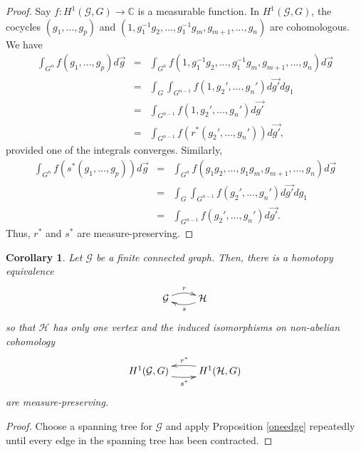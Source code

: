 \documentclass[12pt]{article}
\newtheorem{cor}[thm]{Corollary}
\newcommand{\C}{\mathbb{C}}
\newcommand{\HH}{\mathcal{H}}
\newcommand{\GG}{\mathcal{G}}
\newcommand{\be}{\begin{equation}}
\newcommand{\ee}{\end{equation}}
\newcommand{\bea}{\begin{eqnarray}}
\newcommand{\eea}{\end{eqnarray}}
\newcommand{\nn}{\nonumber}
\begin{document}
\begin{proof}
Say $f : H^1(\GG, G) \to \C$ is a measurable function.  In $H^1(\GG, G)$, the cocycles $(g_1,...,g_p)$ and $(1,g_1^{-1}g_2,...,g_1^{-1}g_m,g_{m+1},...,g_n)$ are cohomologous.  We have
\bea
\int_{G^n} f(g_1,...,g_p)d\vec{g}
&=& \int_{G^n} f(1,g_1^{-1}g_2,...,g_1^{-1}g_m,g_{m+1},...,g_n)d\vec{g}\nn\\
&=& \int_G \int_{G^{n-1}} f(1,g_2',...,g_n')d\vec{g'}dg_1\nn\\
&=& \int_{G^{n-1}} f(1,g_2',...,g_n')d\vec{g'}\nn\\
&=& \int_{G^{n-1}} f(r^*(g_2',...,g_n'))d\vec{g'},
\eea
provided one of the integrals converges.  Similarly,
\bea
\int_{G^n} f(s^*(g_1,...,g_p))d\vec{g}
&=& \int_{G^n} f(g_1g_2,...,g_1g_m,g_{m+1},...,g_n)d\vec{g}\nn\\
&=& \int_G \int_{G^{n-1}} f(g_2',...,g_n')d\vec{g'}dg_1\nn\\
&=& \int_{G^{n-1}} f(g_2',...,g_n')d\vec{g'}.
\eea
Thus, $r^*$ and $s^*$ are measure-preserving.
\end{proof}


\begin{cor}\label{littlecrap}
Let $\GG$ be a finite connected graph.  Then, there is a homotopy equivalence
\be 
\xymatrix{
\GG \ar@/^.5pc/[r]^r & \ar@/^.5pc/[l]^s \HH
}
\ee
so that $\HH$ has only one vertex and the induced isomorphisms on non-abelian cohomology
\be 
\xymatrix{
H^1(\GG,G) \ar@/_.5pc/[r]_{s^*} & \ar@/_.5pc/[l]_{r^*} H^1(\HH,G)
}
\ee
are measure-preserving.
\end{cor}
\begin{proof}
Choose a spanning tree for $\GG$ and apply Proposition \ref{oneedge} repeatedly until every edge in the spanning tree has been contracted.
\end{proof}
\end{document}
